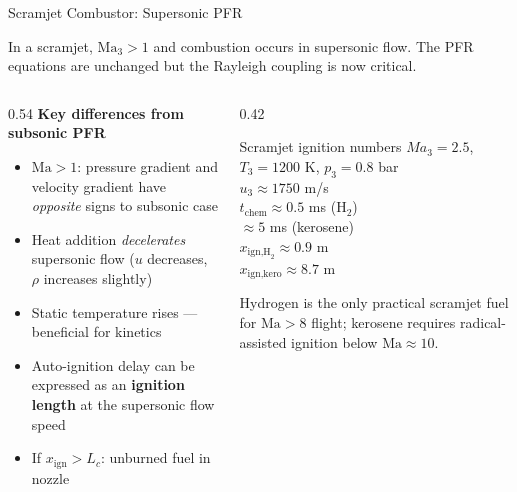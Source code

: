 \documentclass[12pt,aspectratio=169]{beamer}
\newcommand{\tchem}{t_{\text{chem}}}
\newcommand{\Ma}{\mathrm{Ma}}
\begin{document}
\begin{frame}{Scramjet Combustor: Supersonic PFR}

  In a scramjet, $\Ma_3 > 1$ and combustion occurs in supersonic
  flow.  The PFR equations are unchanged but the Rayleigh coupling
  is now critical.

  \begin{columns}[t]
    \begin{column}{0.54\textwidth}
      \textbf{Key differences from subsonic PFR}
      \begin{itemize}
        \item $\Ma > 1$: pressure gradient and velocity gradient
              have \emph{opposite} signs to subsonic case
        \item Heat addition \emph{decelerates} supersonic flow
              ($u$ decreases, $\rho$ increases slightly)
        \item Static temperature rises --- beneficial for kinetics
        \item Auto-ignition delay can be expressed as an
              \textbf{ignition length} at the supersonic flow speed
        \item If $x_{\text{ign}} > L_c$: unburned fuel in nozzle
      \end{itemize}
    \end{column}
    \begin{column}{0.42\textwidth}
      \begin{alertblock}{Scramjet ignition numbers}
        $Ma_3 = 2.5$, $T_3 = 1200$ K, $p_3 = 0.8$ bar\\
        $u_3 \approx 1750$ m/s\\
        $\tchem \approx 0.5$ ms (H$_2$)\\
        \hspace{1.8em} $\approx 5$ ms (kerosene)\\[4pt]
        $x_{\text{ign,H}_2} \approx 0.9$ m\\
        $x_{\text{ign,kero}} \approx 8.7$ m
      \end{alertblock}
      \small Hydrogen is the only practical scramjet fuel
      for $\Ma > 8$ flight; kerosene requires radical-assisted
      ignition below $\Ma \approx 10$.
    \end{column}
  \end{columns}
\end{frame}
\end{document}

